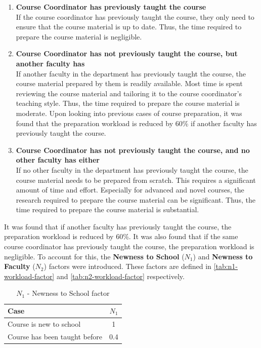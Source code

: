 \begin{enumerate}
  \item \textbf{Course Coordinator has previously taught the course}\\
        If the course coordinator has previously taught the course, they only need to ensure that the course material is up to date. Thus, the time required to prepare the course material is negligible.

  \item \textbf{Course Coordinator has not previously taught the course, but another faculty has}\\
        If another faculty in the department has previously taught the course, the course material prepared by them is readily available. Most time is spent reviewing the course material and tailoring it to the course coordinator's teaching style. Thus, the time required to prepare the course material is moderate. Upon looking into previous cases of course preparation, it was found that the preparation workload is reduced by 60\% if another faculty has previously taught the course.

  \item \textbf{Course Coordinator has not previously taught the course, and no other faculty has either}\\
        If no other faculty in the department has previously taught the course, the course material needs to be prepared from scratch. This requires a significant amount of time and effort. Especially for advanced and novel courses, the research required to prepare the course material can be significant. Thus, the time required to prepare the course material is substantial.
\end{enumerate}

It was found that if another faculty has previously taught the course, the preparation workload is reduced by 60\%. It was also found that if the same course coordinator has previously taught the course, the preparation workload is negligible. To account for this, the \textbf{Newness to School} (\(N_1\)) and \textbf{Newness to Faculty} (\(N_2\)) factors were introduced. These factors are defined in \autoref{tab:n1-workload-factor} and \autoref{tab:n2-workload-factor} respectively.

\begin{table}[ht]
  \centering
  \begin{tabular}{|l|c|}
    \hline
    \textbf{Case}                 & \textbf{\(N_1\)} \\ \hline
    Course is new to school       & 1                \\ \hline
    Course has been taught before & 0.4              \\ \hline
  \end{tabular}
  \caption{\(N_1\) - Newness to School factor}
  \label{tab:n1-workload-factor}
\end{table}

